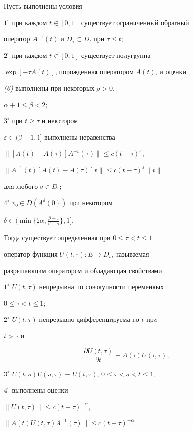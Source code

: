 \begin{thmnonum} Пусть выполнены условия





$1^\circ$ при каждом $t\in[0,1]$ существует ограниченный обратный


оператор $A^{-1}(t)$ и $D_\tau\subset D_t$ при $\tau\le t;$





$2^\circ$ при каждом $t\in[0,1]$ существует полугруппа


$\exp[-\tau A(t)]$, порожденная оператором $A(t)$, и оценки


{\em (6)} выполнены при некоторых $\rho>0$,


$\alpha+1\le\beta<2;$





$3^\circ$ при $t\ge\tau$ и некотором


$\varepsilon\in(\beta-1,1]$ выполнены неравенства


$\|[A(t)-A(\tau)]A^{-1}(\tau)\|\le c(t-\tau)^\varepsilon$,


$\|A^{-1}(t)[A(t)-A(\tau)]v\|\le c(t-\tau)^\varepsilon\|v\|$


для любого $v\in D_\tau;$





$4^\circ$ $v_0\in D(A^\delta(0))$ при некотором


$\delta\in\bigl(\min\bigl\{2\alpha,


\frac{\beta-1}{\beta-\alpha}\bigr\},1\bigr]$.





Тогда существует определенная при $0\le\tau<t\le 1$


оператор-функция $U(t,\tau):E\to D_t$, называемая


разрешающим оператором и обладающая свойствами





$1^\circ$ $U(t,\tau)$ непрерывна по совокупности переменных


$0\le\tau<t\le 1;$





$2^\circ$ $U(t,\tau)$ непрерывно дифференцируема по $t$ при


$t>\tau$ и


$$


\frac{\partial U(t,\tau)}{\partial t}=A(t)U(t,\tau);


$$





$3^\circ$ $U(t,s)U(s,\tau)=U(t,\tau)$, $0\le\tau<s<t\le 1;$





$4^\circ$ выполнены оценки


$\|U(t,\tau)\|\le c(t-\tau)^{-\alpha}$,


$\|A(t)U(t,\tau)A^{-1}(\tau)\|\le c(t-\tau)^{-\alpha}$.


\end{thmnonum}
